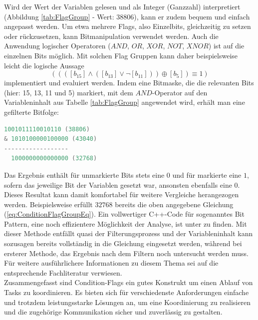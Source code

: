\documentclass{llncs}
\begin{document}
Wird der Wert der Variablen gelesen und als Integer (Ganzzahl) interpretiert (Abbildung \ref{tab:FlagGroup} - Wert: $38806$), kann er zudem bequem und einfach angepasst werden. Um etwa mehrere Flags, also Einzelbits, gleichzeitig zu setzen oder rückzusetzen, kann Bitmanipulation verwendet werden. Auch die Anwendung logischer Operatoren ($AND$, $OR$, $XOR$, $NOT$, $XNOR$) ist auf die einzelnen Bits möglich. Mit solchen Flag Gruppen kann daher beispielsweise leicht die logische Aussage
\begin{equation}
((([b_{15}] \wedge ([b_{13}] \vee \neg[b_{11}]))\oplus [b_{5}])\equiv 1)
\label{eq:ConditionFlagGroupEq}
\end{equation}
implementiert und evaluiert werden. Indem eine Bitmaske, die die relevanten Bits (hier: 15, 13, 11 und 5) markiert, mit dem $AND$-Operator auf den Variableninhalt aus Tabelle \ref{tab:FlagGroup} angewendet wird, erhält man eine gefilterte Bitfolge:
{
\lstset{basicstyle=\footnotesize, frame=tb, xleftmargin=.3\textwidth, xrightmargin=.29\textwidth}
\begin{lstlisting}[language=C]
  1001011110010110 (38806)
& 1010100000100000 (43040)
------------------
  1000000000000000 (32768)
\end{lstlisting}
}
Das Ergebnis enthält für unmarkierte Bits stets eine $0$ und für markierte eine $1$, sofern das jeweilige Bit der Variablen gesetzt war, ansonsten ebenfalls eine $0$. Dieses Resultat kann damit komfortabel für weitere Vergleiche herangezogen werden. Beispielsweise erfüllt $32768$ bereits die oben angegebene Gleichung (\ref{eq:ConditionFlagGroupEq}). Ein vollwertiger C++-Code für sogenanntes Bit Pattern, eine noch effizientere Möglichkeit der Analyse, ist unter \autocite{Turner2020} zu finden. Mit dieser Methode entfällt quasi der Filterungsprozess und der Variableninhalt kann sozusagen bereits vollständig in die Gleichung eingesetzt werden, während bei ersterer Methode, das Ergebnis nach dem Filtern noch untersucht werden muss. Für weitere ausführlichere Informationen zu diesem Thema sei auf die entsprechende Fachliteratur verwiesen.\\

Zusammengefasst sind Condition-Flags ein gutes Konstrukt um einen Ablauf von Tasks zu koordinieren. Es bieten sich für verschiedenste Anforderungen einfache und trotzdem leistungsstarke Lösungen an, um eine Koordinierung zu realisieren und die zugehörige Kommunikation sicher und zuverlässig zu gestalten.
\end{document}
